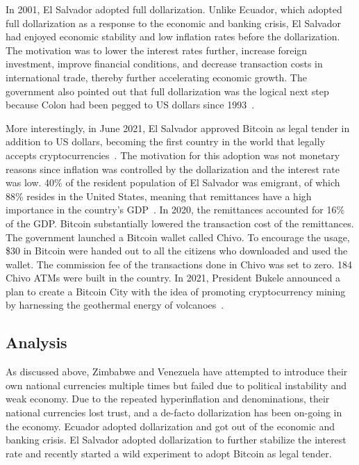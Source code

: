 \documentclass[dvipdfmx,a4paper]{article}
\begin{document}
In 2001, El Salvador adopted full dollarization. Unlike Ecuador, which adopted full dollarization as a response to the economic and banking crisis, El Salvador had enjoyed economic stability and low inflation rates before the dollarization. The motivation was to lower the interest rates further, increase foreign investment, improve financial conditions, and decrease transaction costs in international trade, thereby further accelerating economic growth. The government also pointed out that full dollarization was the logical next step because Colon had been pegged to US dollars since 1993~\cite{quispe2006official}.

More interestingly, in June 2021, El Salvador approved Bitcoin as legal tender in addition to US dollars, becoming the first country in the world that legally accepts cryptocurrencies~\cite{alvarez2023cryptocurrencies,alonso2023salvador}. The motivation for this adoption was not monetary reasons since inflation was controlled by the dollarization and the interest rate was low. 40\% of the resident population of El Salvador was emigrant, of which 88\% resides in the United States, meaning that remittances have a high importance in the country's GDP~\cite{castillo2011macroeconomic}. In 2020, the remittances accounted for 16\% of the GDP. Bitcoin substantially lowered the transaction cost of the remittances. The government launched a Bitcoin wallet called Chivo. To encourage the usage, \$30 in Bitcoin were handed out to all the citizens who downloaded and used the wallet. The commission fee of the transactions done in Chivo was set to zero. 184 Chivo ATMs were built in the country. In 2021, President Bukele announced a plan to create a Bitcoin City with the idea of promoting cryptocurrency mining by harnessing the geothermal energy of volcanoes~\cite{alonso2023salvador}.

\subsection{Analysis}

As discussed above, Zimbabwe and Venezuela have attempted to introduce their own national currencies multiple times but failed due to political instability and weak economy. Due to the repeated hyperinflation and denominations, their national currencies lost trust, and a de-facto dollarization has been on-going in the economy. Ecuador adopted dollarization and got out of the economic and banking crisis. El Salvador adopted dollarization to further stabilize the interest rate and recently started a wild experiment to adopt Bitcoin as legal tender.
\end{document}
